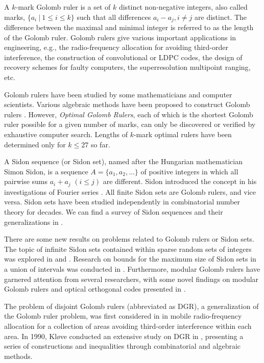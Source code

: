 \documentclass[preprint,12pt]{elsarticle}
\begin{document}
A $k$-mark  Golomb ruler is a set of $k$ distinct non-negative integers, also called marks, $\{a_i\:|\: 1\leq i \leq k\}$ such that all differences $a_i-a_j, i \neq j$ are distinct. The difference between the maximal and minimal integer is referred to as the length of the Golomb ruler. Golomb rulers give various important applications in engineering, e.g., the radio-frequency allocation for avoiding third-order interference\cite{Babcock, Golomb1977}, the construction of convolutional or LDPC codes\cite{Robinson2, Chen2012, Kim}, the design of recovery schemes for faulty computers\cite{klonowska2005optimal}, the superresolution multipoint ranging\cite{Oshiga}, etc.

Golomb rulers have been studied by some mathematicians and computer scientists. Various algebraic methods have been proposed to construct Golomb rulers \cite{bose1962theorems, drakakis2009symmetry, ET1941,ruzsa1993solving,singer1938theorem}. However, \textit{Optimal Golomb Rulers}, each of which is the shortest Golomb ruler possible for a given number of marks\cite{Polash}, can only be discovered or verified by exhaustive computer search.  Lengths of $k$-mark optimal rulers have been determined only for $k \leq 27$ so far.


A Sidon sequence (or Sidon set), named after the Hungarian mathematician Simon Sidon, 
is a sequence $A = \{a_1, a_2, ...\}$ of positive integers in which all pairwise sums $a_i + a_j$
$(i \le j)$ are different. Sidon introduced the concept in his investigations of Fourier series \cite{Sidon}.
All finite Sidon sets are Golomb rulers, and vice versa.
Sidon sets have been studied independently in combinatorial number theory for decades.
We can find a survey of Sidon sequences and their generalizations in \cite{O'Bryant2004survey}.


There are some new results on problems related to Golomb rulers or Sidon sets. The topic of infinite Sidon sets contained within sparse random sets of integers was explored in \cite{Fabian2019} and \cite{Kohayakawa2018}. Research on bounds for the maximum size of Sidon sets in a union of intervals was conducted in \cite{Riblet}. Furthermore, modular Golomb rulers have garnered attention from several researchers, with some novel findings on modular Golomb rulers and optical orthogonal codes presented in \cite{MGolombrulers}.



The problem of disjoint Golomb rulers (abbreviated as DGR), a generalization of the Golomb ruler problem, was first considered in \cite{wende1981} in mobile radio-frequency allocation for a collection of areas avoiding third-order interference within each area.
In 1990, Kl{\o}ve conducted an extensive study on DGR in \cite{Klove}, presenting a series of constructions and inequalities through combinatorial and algebraic methods.
\end{document}
